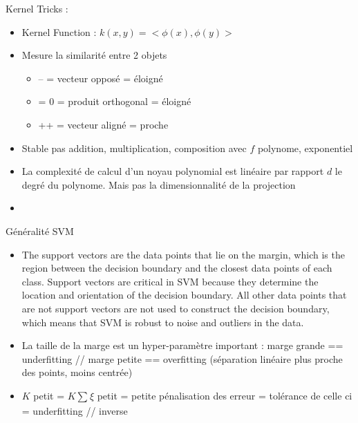 \documentclass{article}
\begin{document}
\begin{multicols}{2}
\begin{itemize}
\end{itemize}
Kernel Tricks : 
\begin{itemize}
    \item Kernel Function : $ k(x,y) = <\phi (x), \phi(y)> $
    \item Mesure la similarité entre 2 objets \begin{itemize}
        \item -- = vecteur opposé = éloigné
        \item = 0 = produit orthogonal = éloigné 
        \item ++ = vecteur aligné = proche
    \end{itemize}
    \item Stable pas addition, multiplication, composition avec $ f $ polynome, exponentiel
    \item La complexité de calcul d'un noyau polynomial est linéaire par rapport $d$ le degré du polynome. Mais pas la dimensionnalité de la projection
    \item 
\end{itemize}

Généralité SVM 
\begin{itemize}
    \item The support vectors are the data points that lie on the margin, which is the region between the decision boundary and the closest data points of each class. Support vectors are critical in SVM because they determine the location and orientation of the decision boundary. All other data points that are not support vectors are not used to construct the decision boundary, which means that SVM is robust to noise and outliers in the data.
    \item La taille de la marge est un hyper-paramètre important : marge grande == underfitting // marge petite == overfitting (séparation linéaire plus proche des points, moins centrée)
    \item $ K $ petit = $ K \sum_{}^{}\xi  $ petit = petite pénalisation des erreur = tolérance de celle ci = underfitting // inverse
\end{itemize}


\end{multicols}
\end{document}
